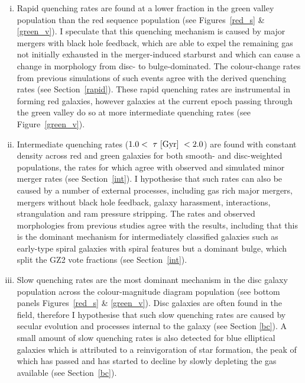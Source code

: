\begin{enumerate}[(i)]
\item Rapid quenching rates are found at a lower fraction in the green valley population than the red sequence population (see Figures~\ref{red_s} \& \ref{green_v}). I speculate that this quenching mechanism is caused by major mergers with black hole feedback, which are able to expel the remaining gas not initially exhausted in the merger-induced starburst and which can cause a change in morphology from disc- to bulge-dominated. The colour-change rates from previous simulations of such events agree with the derived quenching rates (see Section~\ref{rapid}). These rapid quenching rates are instrumental in forming red galaxies, however galaxies at the current epoch passing through the green valley do so at more intermediate quenching rates (see Figure~\ref{green_v}).

\item Intermediate quenching rates ($1.0 < ~\tau~\rm{[Gyr]}~ < 2.0 $) are found with constant density across red and green galaxies for both smooth- and disc-weighted populations, the rates for which agree with observed and simulated minor merger rates (see Section~\ref{int}). I hypothesise that such rates can also be caused by a number of external processes, including gas rich major mergers, mergers without black hole feedback, galaxy harassment, interactions, strangulation and ram pressure stripping. The rates and observed morphologies from previous studies agree with the results, including that this is the dominant mechanism for intermediately classified galaxies such as early-type spiral galaxies with spiral features but a dominant bulge, which split the GZ2 vote fractions (see Section~\ref{int}). 

\item Slow quenching rates are the most dominant mechanism in the disc galaxy population across the colour-magnitude diagram population (see bottom panels Figures~\ref{red_s} \& \ref{green_v}). Disc galaxies are often found in the field, therefore I hypothesise that such slow quenching rates are caused by secular evolution and processes internal to the galaxy (see Section \ref{bc}). A small amount of slow quenching rates is also detected for blue elliptical galaxies which is attributed to a reinvigoration of star formation, the peak of which has passed and has started to decline by slowly depleting the gas available (see Section~\ref{bc}). 
\end{enumerate}
